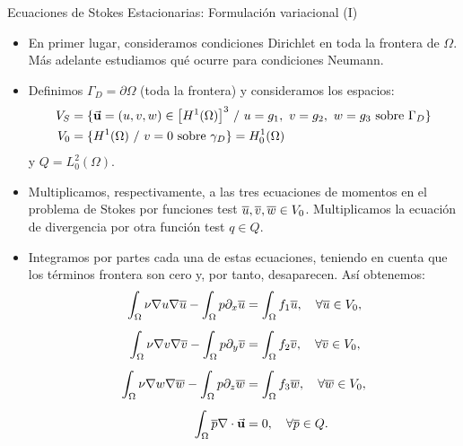 \documentclass[9pt, dvipsnames,]{beamer}
\begin{document}
\begin{frame}{Ecuaciones de Stokes Estacionarias: Formulación variacional (I)}
  \small
  \begin{itemize}
  \item En primer lugar, consideramos condiciones Dirichlet en toda la frontera de $\Omega$. Más adelante estudiamos qué ocurre para condiciones Neumann.
  \item Definimos $\Gamma_D = \partial\Omega$ (toda la frontera) y consideramos los espacios:
    \begin{align*}
      V_S &= \{ \vec{\mathbf{u}}=(u,v,w)\in \big[H^1(\Omega)\big]^3 \ / \ u=g_ 1,\ v=g_ 2,\ w=g_3
            \text{ sobre } {\Gamma_D} \}
      \\
      V_0 &= \{ H^1(\Omega) \ /\ v=0 \text{ sobre }\gamma_D \} = H^1_0(\Omega)
    \end{align*}
    y
    $Q=L_0^2(\Omega)$.
  \item Multiplicamos, respectivamente, a las tres
    ecuaciones de momentos en el problema de Stokes por funciones test
    $\overline u, \overline v, \overline w \in V_0$. Multiplicamos la ecuación de divergencia
    por otra función test $q\in Q$.
  \item Integramos por partes cada una de estas ecuaciones, teniendo
    en cuenta que los términos frontera son cero y, por tanto,
    desaparecen. Así obtenemos:
    \begin{align*}
      \int_\Omega \nu\nabla u\nabla \overline u - \int_\Omega p\partial_x \overline u &= \int_\Omega f_1 \overline u, \quad \forall \overline u\in V_0,
      \\[0.5em]
      \int_\Omega \nu\nabla v\nabla \overline v - \int_\Omega p\partial_y \overline v &= \int_\Omega f_2 \overline v, \quad \forall \overline v\in V_0,
      \\[0.5em]
      \int_\Omega \nu\nabla w\nabla \overline w - \int_\Omega p\partial_z \overline w &= \int_\Omega f_3 \overline w, \quad \forall \overline w\in V_0,
      \\[0.5em]
      \int_\Omega \overline {p} \nabla\cdot{}\vec{\mathbf{u}} & =  0, \quad \forall \overline {p} \in Q.
    \end{align*}

  \end{itemize}
\end{frame}
\end{document}
